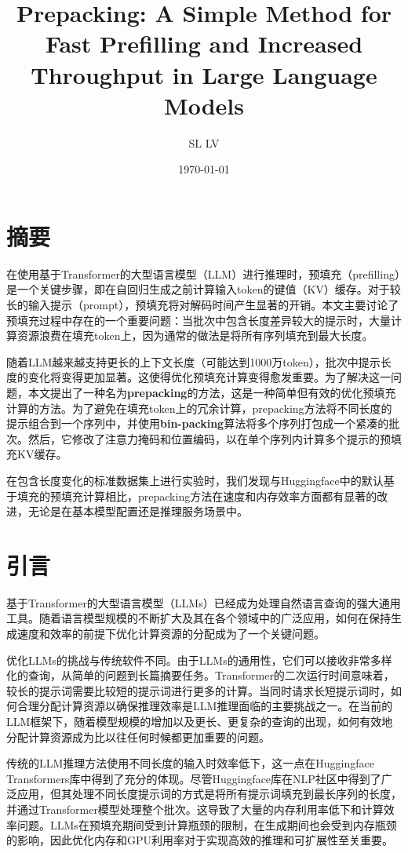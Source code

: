 \documentclass[twocolumn, 10pt]{article} %
\theoremstyle{remark}
\begin{document}
\title{Prepacking: A Simple Method for Fast Prefilling and Increased Throughput in Large Language Models}
\author{SL LV}
\date{\today}
\maketitle

\section{摘要}

在使用基于Transformer的大型语言模型（LLM）进行推理时，预填充（prefilling）是一个关键步骤，即在自回归生成之前计算输入token的键值（KV）缓存。对于较长的输入提示（prompt），预填充将对解码时间产生显著的开销。本文主要讨论了预填充过程中存在的一个重要问题：当批次中包含长度差异较大的提示时，大量计算资源浪费在填充token上，因为通常的做法是将所有序列填充到最大长度。

随着LLM越来越支持更长的上下文长度（可能达到1000万token），批次中提示长度的变化将变得更加显著。这使得优化预填充计算变得愈发重要。为了解决这一问题，本文提出了一种名为\textbf{prepacking}的方法，这是一种简单但有效的优化预填充计算的方法。为了避免在填充token上的冗余计算，prepacking方法将不同长度的提示组合到一个序列中，并使用\textbf{bin-packing}算法将多个序列打包成一个紧凑的批次。然后，它修改了注意力掩码和位置编码，以在单个序列内计算多个提示的预填充KV缓存。

在包含长度变化的标准数据集上进行实验时，我们发现与Huggingface中的默认基于填充的预填充计算相比，prepacking方法在速度和内存效率方面都有显著的改进，无论是在基本模型配置还是推理服务场景中。




\section{引言}
基于Transformer的大型语言模型（LLMs）已经成为处理自然语言查询的强大通用工具。随着语言模型规模的不断扩大及其在各个领域中的广泛应用，如何在保持生成速度和效率的前提下优化计算资源的分配成为了一个关键问题。

优化LLMs的挑战与传统软件不同。由于LLMs的通用性，它们可以接收非常多样化的查询，从简单的问题到长篇摘要任务。Transformer的二次运行时间意味着，较长的提示词需要比较短的提示词进行更多的计算。当同时请求长短提示词时，如何合理分配计算资源以确保推理效率是LLM推理面临的主要挑战之一。在当前的LLM框架下，随着模型规模的增加以及更长、更复杂的查询的出现，如何有效地分配计算资源成为比以往任何时候都更加重要的问题。

传统的LLM推理方法使用不同长度的输入时效率低下，这一点在Huggingface Transformers库中得到了充分的体现。尽管Huggingface库在NLP社区中得到了广泛应用，但其处理不同长度提示词的方式是将所有提示词填充到最长序列的长度，并通过Transformer模型处理整个批次。这导致了大量的内存利用率低下和计算效率问题。LLMs在预填充期间受到计算瓶颈的限制，在生成期间也会受到内存瓶颈的影响，因此优化内存和GPU利用率对于实现高效的推理和可扩展性至关重要。
\end{document}
